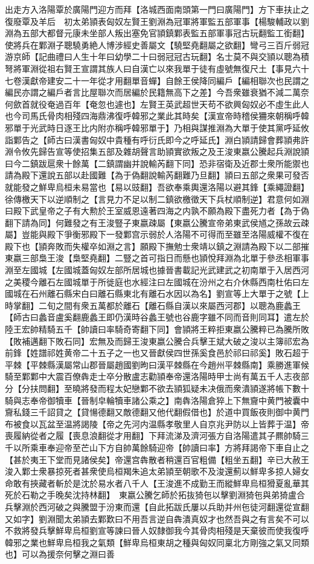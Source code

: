 出走方入洛陽覃於廣陽門迎方而拜【洛城西面南頭第一門曰廣陽門】方下車扶止之復廢覃及羊后　初太弟頴表匈奴左賢王劉淵為冠軍將軍監五部軍事【楊駿輔政以劉淵為五部大都督元康未坐部人叛出塞免官頴鎮鄴表監五部軍事冠古玩翻監工銜翻】使將兵在鄴淵子聰驍勇絶人博涉經史善屬文【驍堅堯翻屬之欲翻】彎弓三百斤弱冠游京師【記曲禮曰人生十年曰幼學二十曰弱冠冠古玩翻】名士莫不與交頴以聰為積弩將軍淵從祖右賢王宣謂其族人曰自漢亡以來我單于徒有虛號無復尺土【事見六十七卷漢獻帝建安二十一年從才用翻單音蟬】自餘王侯降同編戶【編相聯次也民謂之編民亦謂之編戶者言比屋聯次而居編於民籍無高下之差】今吾衆雖衰猶不減二萬奈何歛首就役奄過百年【奄忽也遽也】左賢王英武超世天苟不欲興匈奴必不虛生此人也今司馬氏骨肉相殘四海鼎沸復呼韓邪之業此其時矣【漢宣帝時稽侯狦來朝稱呼韓邪單于光武時日逐王比内附亦稱呼韓邪單于】乃相與謀推淵為大單于使其黨呼延攸詣鄴告之【師古曰漢書匈奴中貴種有呼衍氏即今之呼延氏】淵白頴請歸會葬頴弗許淵令攸先歸告宣等使招集五部及雜胡聲言助頴實欲叛之及王浚東嬴公騰起兵淵說頴曰今二鎮跋扈衆十餘萬【二鎮謂幽并說輸芮翻下同】恐非宿衛及近郡士衆所能禦也請為殿下還說五部以赴國難【為于偽翻說輸芮翻難乃旦翻】頴曰五部之衆果可發否就能發之鮮卑烏桓未易當也【易以豉翻】吾欲奉乘輿還洛陽以避其鋒【乘繩證翻】徐傳檄天下以逆順制之【言見力不足以制二鎮欲檄徵天下兵杖順制逆】君意何如淵曰殿下武皇帝之子有大勲於王室威恩遠著四海之内孰不願為殿下盡死力者【為于偽翻下請為同】何難發之有王浚豎子東嬴疎屬【東嬴公騰宣帝弟東武侯馗之孫故云疎屬】豈能與殿下爭衡邪殿下一發鄴宫示弱於人洛陽不可得而至雖至洛陽威權不復在殿下也【頴奔敗而失權卒如淵之言】願殿下撫勉士衆靖以鎮之淵請為殿下以二部摧東嬴三部梟王浚【梟堅堯翻】二豎之首可指日而懸也頴悅拜淵為北單于參丞相軍事淵至左國城【左國城蓋匈奴左部所居城也據晉書載記光武建武之初南單于入居西河之美稷今離石左國城單于所徙庭也水經注曰左國城在汾州之右介休縣西南杜佑曰左國城在石州離石縣宋白曰離石縣東北有離石水因以為名】劉宣等上大單于之號【上時掌翻】二旬之間有衆五萬都於離石【離石縣自漢以來屬西河郡】以聰為鹿蠡王【師古曰蠡音盧奚翻鹿蠡王即仍漢時谷蠡王號也谷鹿字雖不同而音則同耳】遣左於陸王宏帥精騎五千【帥讀曰率騎奇寄翻下同】會頴將王粹拒東嬴公騰粹已為騰所敗【敗補邁翻下敗石同】宏無及而歸王浚東嬴公騰合兵擊王斌大破之浚以主簿祁宏為前鋒【姓譜祁姓黄帝二十五子之一也又晉獻侯四世孫奚食邑於祁曰祁奚】敗石超于平棘【平棘縣漢屬常山郡晉屬趙國劉昫曰漢平棘縣在今趙州平棘縣南】乘勝進軍候騎至鄴鄴中大震百僚犇走士卒分散盧志勸頴奉帝還洛陽時甲士尚有萬五千人志夜部分【分扶問翻】至曉將發而程太妃戀鄴不欲去頴狐疑未决俄而衆潰頴遂將帳下數十騎與志奉帝御犢車【晉制皁輪犢車諸公乘之】南犇洛陽倉猝上下無齎中黄門被囊中齎私錢三千詔貸之【貸愓德翻又敵德翻又他代翻假借也】於道中買飯夜則御中黄門布被食以瓦盆至温將謁陵【帝之先河内温縣孝敬里人自京兆尹防以上皆葬于温】帝喪履納從者之履【喪息浪翻從才用翻】下拜流涕及濟河張方自洛陽遣其子羆帥騎三千以所乘車奉迎帝至芒山下方自帥萬餘騎迎帝【帥讀曰率】方將拜謁帝下車自止之【甚於夷王下堂而見諸侯矣】帝還宫犇散者稍還百官粗備【粗坐五翻】辛已大赦王浚入鄴士衆暴掠死者甚衆使烏桓羯朱追太弟頴至朝歌不及浚還薊以鮮卑多掠人婦女命敢有挾藏者斬於是沈於易水者八千人【王浚進不成勤王而縱鮮卑烏桓猾夏亂華其死於石勒之手晚矣沈持林翻】　東嬴公騰乞師於拓抜猗㐌以擊劉淵猗㐌與弟猗盧合兵擊淵於西河破之與騰盟于汾東而還【自此拓跋氏屢以兵助并州㐌徒河翻還從宣翻又如字】劉淵聞太弟頴去鄴歎曰不用吾言逆自犇潰真奴才也然吾與之有言矣不可以不救將發兵擊鮮卑烏桓劉宣等諫曰晉人奴隸御我今其骨肉相殘是天棄彼而使我復呼韓邪之業也鮮卑烏桓我之氣類【鮮卑烏桓東胡之種與匈奴同稟北方剛強之氣又同類也】可以為援奈何擊之淵曰善